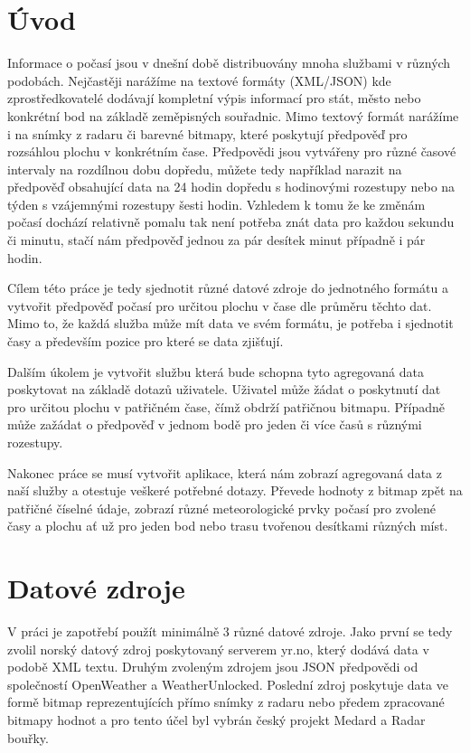 \documentclass[czech,bachelor,dept460,male,csharp,cpdeclaration]{diploma}
\begin{document}
	
	\MakeTitlePages
	
	\chapter{Úvod}
	
	Informace o počasí jsou v dnešní době distribuovány mnoha službami v různých podobách. Nejčastěji narážíme na textové formáty (XML/JSON) kde zprostředkovatelé dodávají kompletní výpis informací pro stát, město nebo konkrétní bod na základě zeměpisných souřadnic. Mimo textový formát narážíme i na snímky z radaru či barevné bitmapy, které poskytují předpověď pro rozsáhlou plochu v konkrétním čase. Předpovědi jsou vytvářeny pro různé časové intervaly na rozdílnou dobu dopředu, můžete tedy například narazit na předpověď obsahující data na 24 hodin dopředu s hodinovými rozestupy nebo na týden s vzájemnými rozestupy šesti hodin. Vzhledem k tomu že ke změnám počasí dochází relativně pomalu tak není potřeba znát data pro každou sekundu či minutu, stačí nám předpověď jednou za pár desítek minut případně i pár hodin.
	
	Cílem této práce je tedy sjednotit různé datové zdroje do jednotného formátu a vytvořit předpověď počasí pro určitou plochu v čase dle průměru těchto dat. Mimo to, že každá služba může mít data ve svém formátu, je potřeba i sjednotit časy a především pozice pro které se data zjišťují.
	
	Dalším úkolem je vytvořit službu která bude schopna tyto agregovaná data poskytovat na základě dotazů uživatele. Uživatel může žádat o poskytnutí dat pro určitou plochu v patřičném čase, čímž obdrží patřičnou bitmapu. Případně může zažádat o předpověď v jednom bodě pro jeden či více časů s různými rozestupy.
	
	Nakonec práce se musí vytvořit aplikace, která nám zobrazí agregovaná data z naší služby a otestuje veškeré potřebné dotazy. Převede hodnoty z bitmap zpět na patřičné číselné údaje, zobrazí různé meteorologické prvky počasí pro zvolené časy a plochu ať už pro jeden bod nebo trasu tvořenou desítkami různých míst.
	
	\chapter{Datové zdroje}
	
	V práci je zapotřebí použít minimálně 3 různé datové zdroje. Jako první se tedy zvolil norský datový zdroj poskytovaný serverem yr.no, který dodává data v podobě XML textu. Druhým zvoleným zdrojem jsou JSON předpovědi od společností OpenWeather a WeatherUnlocked. Poslední zdroj poskytuje data ve formě bitmap reprezentujících přímo snímky z radaru nebo předem zpracované bitmapy hodnot a pro tento účel byl vybrán český projekt Medard a Radar bouřky.
	
\end{document}
